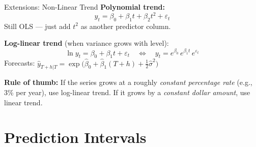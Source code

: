 \documentclass[aspectratio=169, 11pt]{beamer}
\begin{document}
\begin{frame}{Extensions: Non-Linear Trend}
  \textbf{Polynomial trend:}
  \[
    y_t = \beta_0 + \beta_1 t + \beta_2 t^2 + \varepsilon_t
  \]
  Still OLS --- just add $t^2$ as another predictor column.

  \vspace{0.2cm}
  \textbf{Log-linear trend} (when variance grows with level):
  \[
    \ln y_t = \beta_0 + \beta_1 t + \varepsilon_t
    \quad\Leftrightarrow\quad
    y_t = e^{\beta_0}\, e^{\beta_1 t}\, e^{\varepsilon_t}
  \]
  Forecasts: $\hat{y}_{T+h|T} = \exp\!\bigl(\hat{\beta}_0 + \hat{\beta}_1(T+h)
  + \tfrac{1}{2}\hat{\sigma}^2\bigr)$ \hfill{}

  \vspace{0.15cm}
  \begin{keybox}
    \small
    \textbf{Rule of thumb:} If the series grows at a roughly
    \emph{constant percentage rate} (e.g., 3\% per year), use
    log-linear trend. If it grows by a \emph{constant dollar amount},
    use linear trend.
  \end{keybox}
\end{frame}

\section{Prediction Intervals}

\end{document}
